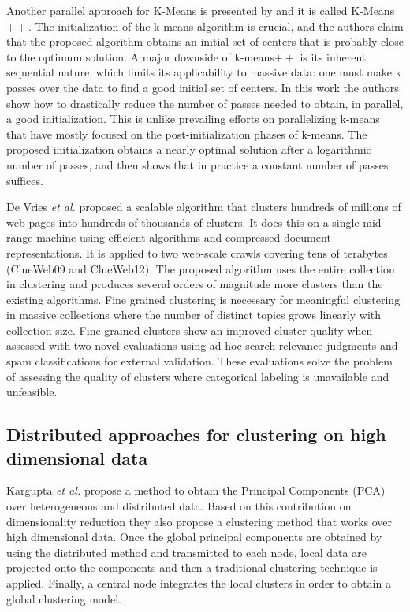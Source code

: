 \documentclass[preprint,12pt,authoryear,review]{elsarticle}
\begin{document}
Another parallel approach for K-Means is presented by \cite{BMVKV12} and it is called K-Means$++$. The initialization of the k means algorithm is crucial, and the authors claim that the proposed algorithm obtains an initial set of centers that is probably close to the optimum solution. A major downside of k-means$++$ is its inherent sequential nature, which limits its applicability to massive data: one must make k passes over the data to find a good initial set of centers. In this work the authors show how to drastically reduce the number of passes needed to obtain, in parallel, a good initialization. This is unlike prevailing efforts on parallelizing k-means that have mostly focused on the post-initialization phases of k-means. The proposed initialization obtains a nearly optimal solution after a logarithmic number of passes, and then shows that in practice a constant number of passes suffices. 

De Vries \textit{et al.} \cite{VVGN15} proposed a scalable algorithm that clusters hundreds of millions of web pages into hundreds of thousands of clusters. It does this on a single mid-range machine using efficient algorithms and compressed document representations. It is applied to two web-scale crawls covering tens of terabytes (ClueWeb09 and ClueWeb12). %
The proposed algorithm uses the entire collection in clustering and produces several orders of magnitude more clusters than the existing algorithms. Fine grained clustering is necessary for meaningful clustering in massive collections where the number of distinct topics grows linearly with collection size. Fine-grained clusters show an improved cluster quality when assessed with two novel evaluations using ad-hoc search relevance judgments and spam classifications for external validation. These evaluations solve the problem of assessing the quality of clusters where categorical labeling is unavailable and unfeasible.

\subsection{Distributed approaches for clustering on high dimensional data}

Kargupta \textit{et al.} \cite{KHSJ01} propose a method to obtain the Principal Components (PCA) over heterogeneous and distributed data. Based on this contribution on dimensionality reduction they also propose a clustering method that works over high dimensional data. Once the global principal components are obtained by using the distributed method and transmitted to each node, local data are projected onto the components and then a traditional clustering technique is applied. Finally, a central node integrates the local clusters in order to obtain a global clustering model.
\end{document}
